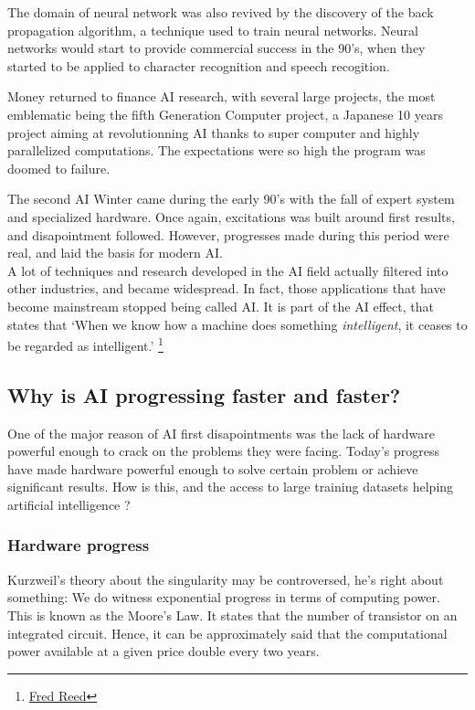 \documentclass[12pt]{article}
\begin{document}
The domain of neural network was also revived by the discovery of the back
propagation algorithm, a technique used to train neural networks. Neural
networks would start to provide commercial success in the 90's, when they
started to be  applied to character recognition and speech recogition.

Money returned to finance AI research, with several large projects, the most
emblematic being the fifth Generation Computer project, a Japanese 10 years
project aiming at revolutionning AI thanks to super computer and highly
parallelized computations. The expectations were so high the program was doomed
to failure.

The second AI Winter came during the early 90's with the fall of expert system
and  specialized hardware. Once again, excitations was built around first
results, and  disapointment followed. However, progresses made during this
period were real,  and laid the basis for modern AI.\\

A lot of techniques and research developed in the AI field actually filtered
into  other industries, and became widespread. In fact, those applications that
have become  mainstream stopped being called AI. It is part of the AI effect,
that states that \lq When we know how a machine does something {\em
intelligent}, it ceases to be regarded as intelligent.\rq
\footnote{\href{http://www.washingtontimes.com/news/2006/apr/13/20060413-105217-7645r/}
{Fred Reed}}

\pagebreak

\subsection{Why is AI progressing faster and faster?}

One of the major reason of AI first disapointments was the lack of hardware
powerful  enough to crack on the problems they were facing. Today's progress
have made hardware powerful enough to solve certain problem or achieve
significant results. How is this, and the  access to large training datasets
helping artificial intelligence ?

\subsubsection{Hardware progress}

Kurzweil's theory about the singularity may be controversed, he's right about
something: We do witness exponential progress in terms of computing power. This
is known as the Moore's Law. It states that the number of transistor on an
integrated circuit. Hence, it can be approximately said that the computational
power available at a given price double every two years.
\end{document}
